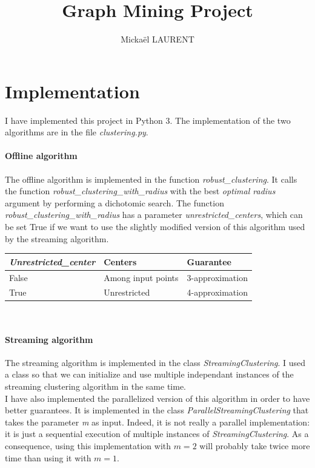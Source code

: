 \documentclass[a4paper]{article}%
\title{\vspace{1.5cm}Graph Mining Project}
\author{Mickaël LAURENT}
\date{\vspace{-5ex}}
\begin{document}
	\maketitle

	\section{Implementation}

	I have implemented this project in Python 3.
	The implementation of the two algorithms are in the file \textit{clustering.py}.

	\paragraph{Offline algorithm} The offline algorithm is implemented in the function \textit{robust\_clustering}.
	It calls the function \textit{robust\_clustering\_with\_radius} with the best \textit{optimal radius} argument by performing a dichotomic search.
	The function \textit{robust\_clustering\_with\_radius} has a parameter \textit{unrestricted\_centers}, which can be set True if we want to use
	the slightly modified version of this algorithm used by the streaming algorithm.\\

	\begin{tabular}{|l|l|l|}
		\hline
		\textit{Unrestricted\_center} & Centers & Guarantee \\
		\hline
		False & Among input points & 3-approximation \\
		True & Unrestricted & 4-approximation \\
		\hline
	 \end{tabular}\\

	\paragraph{Streaming algorithm} The streaming algorithm is implemented in the class \textit{StreamingClustering}.
	I used a class so that we can initialize and use multiple independant instances
	of the streaming clustering algorithm in the same time.\\

	I have also implemented the parallelized version of this algorithm in order to have better guarantees.
	It is implemented in the class \textit{ParallelStreamingClustering} that takes the parameter \textit{m} as input.
	Indeed, it is not really a parallel implementation: it is just a sequential execution of multiple instances
	of \textit{StreamingClustering}. As a consequence, using this implementation with $m=2$ will probably
	take twice more time than using it with $m=1$.
\end{document}
